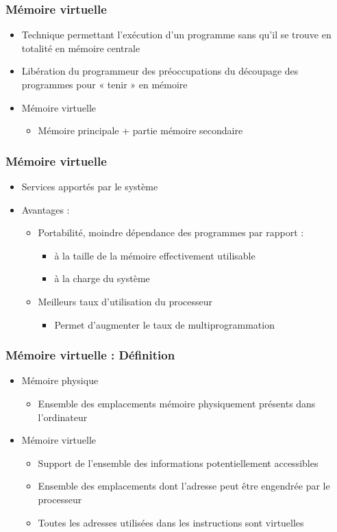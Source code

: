 \begin{frame}
\frametitle{Mémoire virtuelle}
\begin{itemize}
\item Technique permettant l'exécution d'un programme sans qu'il se trouve en totalité en mémoire centrale
\item Libération du programmeur des préoccupations du découpage des programmes pour « tenir » en mémoire
\item Mémoire virtuelle
\begin{itemize}
\item Mémoire principale + partie mémoire secondaire
\end{itemize}
\end{itemize}
\end{frame}


\begin{frame}
\frametitle{Mémoire virtuelle}
\begin{itemize}
\item Services apportés par le système
\item Avantages :
\begin{itemize}
\item Portabilité, moindre dépendance des programmes par rapport :
\begin{itemize}
\item à la taille de la mémoire effectivement utilisable
\item à la charge du système
\end{itemize}
\item Meilleurs taux d'utilisation du processeur
\begin{itemize}
\item Permet d'augmenter le taux de multiprogrammation
\end{itemize}
\end{itemize}
\end{itemize}
\end{frame}

\begin{frame}
\frametitle{Mémoire virtuelle : Définition}
\begin{itemize}
\item Mémoire physique
\begin{itemize}
\item Ensemble des emplacements mémoire physiquement présents dans l'ordinateur
\end{itemize}
\item Mémoire virtuelle
\begin{itemize}
\item Support de l'ensemble des informations potentiellement accessibles
\item Ensemble des emplacements dont l'adresse peut être engendrée par le processeur
\item Toutes les adresses utilisées dans les instructions sont virtuelles
\end{itemize}
\end{itemize}
\end{frame}


